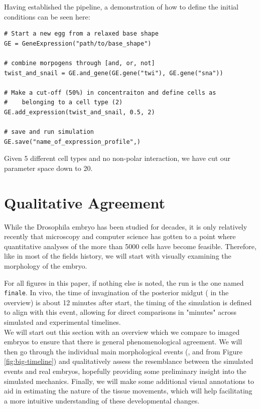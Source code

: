 Having established the pipeline, a demonstration of how to define the initial conditions can be seen here:

\begin{lstlisting}
# Start a new egg from a relaxed base shape
GE = GeneExpression("path/to/base_shape")

# combine morpogens through [and, or, not]
twist_and_snail = GE.and_gene(GE.gene("twi"), GE.gene("sna"))

# Make a cut-off (50%) in concentraiton and define cells as 
#    belonging to a cell type (2) 
GE.add_expression(twist_and_snail, 0.5, 2) 

# save and run simulation
GE.save("name_of_expression_profile",)

\end{lstlisting}

Given 5 different cell types and no non-polar interaction, we have cut our parameter space down to 20.

\newpage


\section{Qualitative Agreement}
While the Drosophila embryo has been studied for decades, it is only relatively recently that microscopy and computer science has gotten to a point where quantitative analyses of the more than 5000 cells have become feasible. Therefore, like in most of the fields history, we will start with visually examining the morphology of the embryo. 

For all figures in this paper, if nothing else is noted, the run is the one named \verb|finale|. In vivo, the time of invagination of the posterior midgut ( in the overview) is about 12 minutes after start, the timing of the simulation is defined to align with this event, allowing for direct comparisons in "minutes" across simulated and experimental timelines.\\


We will start out this section with an overview which we compare to imaged embryos to ensure that there is general phenomenological agreement. We will then go through the individual main morphological events (,  and  from Figure \ref{fig:big-timeline}) and qualitatively assess the resemblance between the simulated events and real embryos, hopefully providing some preliminary insight into the simulated mechanics. Finally, we will make some additional visual annotations to aid in estimating the nature of the tissue movements, which will help facilitating a more intuitive understanding of these developmental changes.

